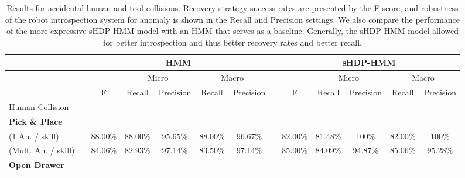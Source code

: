 \documentclass[letterpaper, 10 pt, conference]{ieeeconf}  %
\newcommand{\red}{\textcolor[rgb]{ .773,  0,  .043}}
\begin{document}
\begin{table*}[b]
  \centering
  \caption{Results for accidental human and tool collisions. Recovery strategy success rates are presented by the F-score, and robustness of the robot introspection system for anomaly is shown in the Recall and Precision settings. We also compare the performance of the more expressive sHDP-HMM model with an HMM that serves as a baseline. Generally, the sHDP-HMM model allowed for better introspection and thus better recovery rates and better recall.}
  \label{tbl:results}
\begin{tabular}{lccccccc|ccccc}
               & \multicolumn{1}{l}{} & \multicolumn{5}{c}{HMM}                                         & \multicolumn{1}{l|}{} & \multicolumn{5}{c}{sHDP-HMM}                                                 \\
\midrule               
              					& \multicolumn{1}{l}{} 			&         & \multicolumn{2}{c}{Micro} & \multicolumn{2}{c}{Macro} 			& \multicolumn{1}{l|}{} & \multicolumn{1}{l}{} 	& \multicolumn{2}{c}{Micro} & \multicolumn{2}{c}{Macro} \\
               					&                      			& F       & Recall     & Precision    & Recall     & Precision    			&                      	& F                    	& Recall     				& Precision    & Recall     & Precision    	\\
Human Collision 				&                      			&         &            &              &            &              			&                      	&                      	&            				&              &            &              	\\
\midrule
\textbf{Pick \& Place}  		&                      			&         &            &              &            &              			&                      	&                      	&            				&              &            &              	\\
(1 An. / skill)					&					       		& \red{88.00\%} & 88.00\%    & 95.65\%      & 88.00\%    & 96.67\%      	&                      	& 82.00\%           	& 81.48\%        			& 100\%        & 82.00\%    & 100\%        	\\
(Mult. An. / skill) 			&         						& 84.06\% & 82.93\%    & 97.14\%      & 83.50\%    & 97.14\% 				&                      	& \red{85.00\%}        	& 84.09\%     				& 94.87\%      & 85.06\%    & 95.28\%     	\\
\textbf{Open Drawer}    		&                      			&         &            &              &            &              			&   					&                      	&            				&              &            &              	\\

\end{tabular}
\end{table*}
\end{document}
